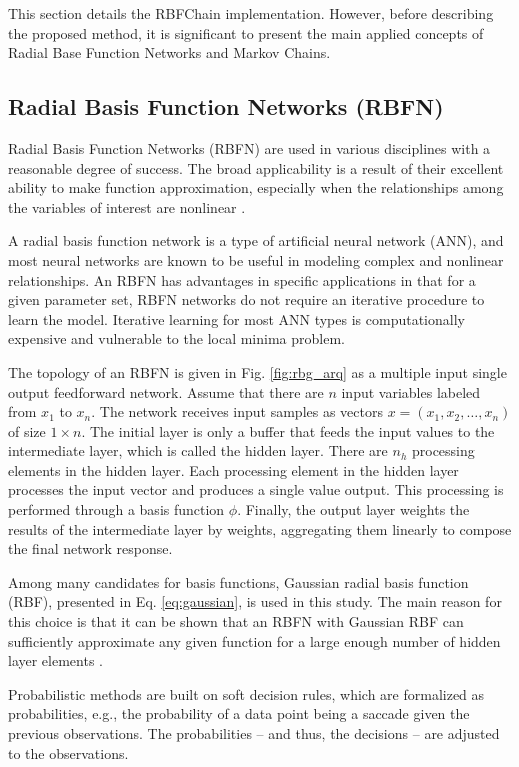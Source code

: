 \documentclass[preprint,12pt]{elsarticle}
\begin{document}
This section details the RBFChain implementation. However, before describing the proposed method, it is significant to present the main applied concepts of Radial Base Function Networks and Markov Chains.

\subsection{Radial Basis Function Networks (RBFN)}

Radial Basis Function Networks (RBFN) are used in various disciplines with a reasonable degree of success. The broad applicability is a result of their excellent ability to make function approximation, especially when the relationships among the variables of interest are nonlinear \cite{Bishop:2006:PRM:1162264}.

A radial basis function network is a type of artificial neural network (ANN), and most neural networks are known to be useful in modeling complex and nonlinear relationships. An RBFN has advantages in specific applications in that for a given parameter set, RBFN networks do not require an iterative procedure to learn the model. Iterative learning for most ANN types is computationally expensive and vulnerable to the local minima problem.

The topology of an RBFN is given in Fig. \ref{fig:rbg_arq} as a multiple input single output feedforward network.
Assume that there are $n$ input variables labeled from $x_1$ to $x_n$.
The network receives input samples as vectors $x=(x_1, x_2, \ldots, x_n)$ of size $1 \times n$.
The initial layer is only a buffer that feeds the input values to the intermediate layer, which is called the hidden layer.
There are $n_h$ processing elements in the hidden layer.
Each processing element in the hidden layer processes the input vector and produces a single value output. This processing is performed through a basis function $\phi$.
Finally, the output layer weights the results of the intermediate layer by weights, aggregating them linearly to compose the final network response.

Among many candidates for basis functions, Gaussian radial basis function (RBF), presented in Eq. \ref{eq:gaussian}, is used in this study. The main reason for this choice is that it can be shown that an RBFN with Gaussian RBF can sufficiently approximate any given function for a large enough number of hidden layer elements \cite{Theodoridis:2008:PRF:1457541}.

Probabilistic methods are built on soft decision rules, which are formalized as probabilities, e.g.,  the probability of a data point being a saccade given the previous observations. The probabilities – and thus, the decisions – are adjusted to the observations.
\end{document}
